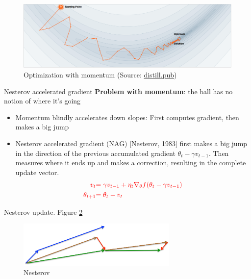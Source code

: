 \documentclass[english]{article}
\begin{document}
\begin{figure}
 \centering
\includegraphics[width=\textwidth]{momentum_webpage.png}
\caption{Optimization with momentum (Source: \href{https://distill.pub/2017/momentum/}{distill.pub})}
\label{Momentum}
\end{figure}








\item {Nesterov accelerated gradient}
\textbf{Problem with momentum}: the ball has no notion of where it's going


\begin{itemize}
\item Momentum blindly accelerates down slopes: First computes gradient, then makes a big jump

\item Nesterov accelerated gradient (NAG) [Nesterov, 1983] first makes a big jump in the direction of the previous accumulated gradient $\theta_t - \gamma v_{t-1}$. Then measures where it ends up and makes a correction, resulting in the complete update vector.
\begin{align*}
\textcolor{red}{v_{t} }&\textcolor{red}{= \gamma v_{t-1} + \eta_t \nabla_\theta f(\theta_t - \gamma v_{t-1})} \\ 
\textcolor{red}{\theta_{t+1}} &\textcolor{red}{= \theta_t - v_t}
\end{align*}

\end{itemize}








\item {Nesterov update}. Figure \ref{Nesterov}
\begin{figure}
 \centering
\includegraphics[width=0.7\textwidth]{nesterov_update_vector.png}
\caption{Nesterov}
\label{Nesterov}
\end{figure}
\end{document}
